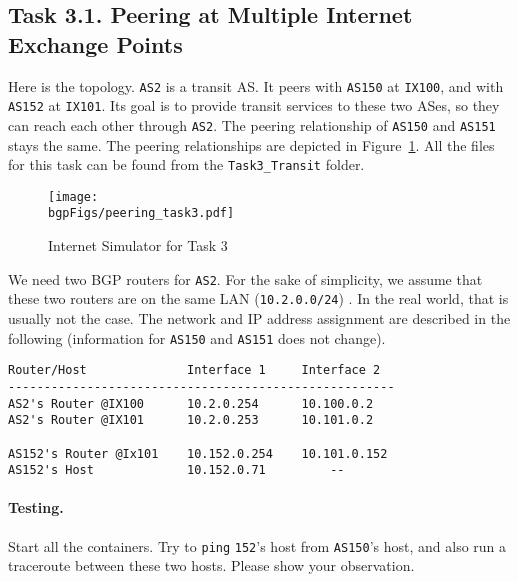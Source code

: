 \subsection{Task 3.1. Peering at Multiple Internet Exchange Points}

Here is the topology. \texttt{AS2} is a transit AS. It peers with \texttt{AS150} at \texttt{IX100},
and with \texttt{AS152} at \texttt{IX101}. Its goal is to provide 
transit services to these two ASes, so they can reach each other 
through \texttt{AS2}.
The peering relationship of \texttt{AS150} and \texttt{AS151}
stays the same. The peering relationships are depicted in
Figure~\ref{bgp:fig:peering3}. All the files for this task 
can be found from the \texttt{Task3\_Transit} folder. 

\begin{figure}[htb]
    \begin{center}
    \texttt{[image: \\bgpFigs/peering\_task3.pdf]}
    \end{center}
    \caption{Internet Simulator for Task 3}
    \label{bgp:fig:peering3}
\end{figure}


We need two BGP routers for \texttt{AS2}. For the sake of 
simplicity, we assume that these two routers are 
on the same LAN (\texttt{10.2.0.0/24}) . 
In the real world, that is usually not the case. 
The network and IP address assignment are 
described in the following (information for 
\texttt{AS150} and \texttt{AS151} does not change). 

\begin{lstlisting}
Router/Host              Interface 1     Interface 2
------------------------------------------------------
AS2's Router @IX100      10.2.0.254      10.100.0.2
AS2's Router @IX101      10.2.0.253      10.101.0.2

AS152's Router @Ix101    10.152.0.254    10.101.0.152
AS152's Host             10.152.0.71         --
\end{lstlisting}


\paragraph{Testing.} 
Start all the containers. 
Try to \texttt{ping} \texttt{152}'s host from \texttt{AS150}'s host, and also
run a traceroute between these two hosts. Please show your observation. 

